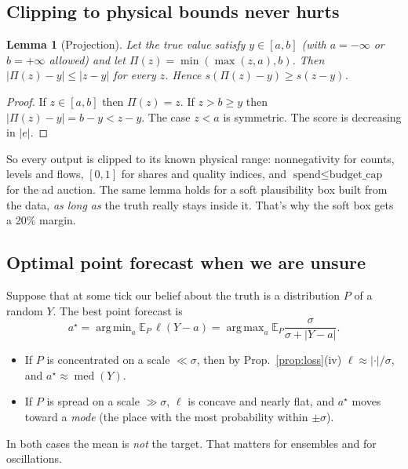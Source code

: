 \documentclass[11pt]{article}
\theoremstyle{plain}
\newtheorem{lemma}[theorem]{Lemma}
\theoremstyle{definition}
\theoremstyle{remark}
\newcommand{\E}{\mathbb{E}}
\newcommand{\abs}[1]{\left\lvert #1 \right\rvert}
\DeclareMathOperator*{\argmin}{arg\,min}
\DeclareMathOperator*{\argmax}{arg\,max}
\DeclareMathOperator{\med}{med}
\begin{document}
\subsection{Clipping to physical bounds never hurts}
\begin{lemma}[Projection]\label{lem:proj}
Let the true value satisfy $y\in[a,b]$ (with $a=-\infty$ or $b=+\infty$ allowed) and let $\Pi(z)=\min(\max(z,a),b)$. Then $\abs{\Pi(z)-y}\le\abs{z-y}$ for every $z$. Hence $s(\Pi(z)-y)\ge s(z-y)$.
\end{lemma}
\begin{proof}
If $z\in[a,b]$ then $\Pi(z)=z$. If $z>b\ge y$ then $\abs{\Pi(z)-y}=b-y< z-y$. The case $z<a$ is symmetric. The score is decreasing in $\abs e$.
\end{proof}
So every output is clipped to its known physical range: nonnegativity for counts, levels and flows, $[0,1]$ for shares and quality indices, and $\text{spend}\le\text{budget\_cap}$ for the ad auction. The same lemma holds for a soft plausibility box built from the data, \emph{as long as} the truth really stays inside it. That's why the soft box gets a 20\% margin.

\subsection{Optimal point forecast when we are unsure}\label{sec:pointforecast}
Suppose that at some tick our belief about the truth is a distribution $P$ of a random $Y$. The best point forecast is
\begin{equation}
a^\star=\argmin_a \E_P\,\ell(Y-a)=\argmax_a\E_P\frac{\sigma}{\sigma+\abs{Y-a}}.
\end{equation}
\begin{itemize}
\item If $P$ is concentrated on a scale $\ll\sigma$, then by Prop.~\ref{prop:loss}(iv) $\ell\approx\abs{\cdot}/\sigma$, and $a^\star\approx\med(Y)$.
\item If $P$ is spread on a scale $\gg\sigma$, $\ell$ is concave and nearly flat, and $a^\star$ moves toward a \emph{mode} (the place with the most probability within $\pm\sigma$).
\end{itemize}
In both cases the mean is \emph{not} the target. That matters for ensembles and for oscillations.
\end{document}
